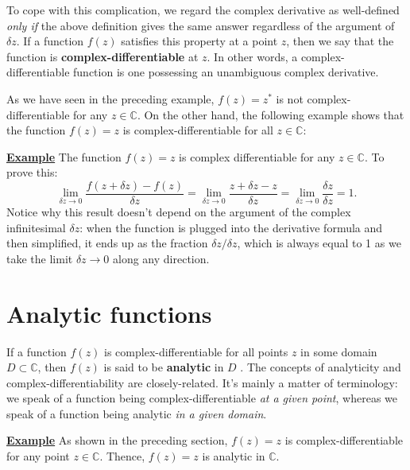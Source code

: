 \documentclass[10pt,a4paper]{article}
\begin{document}
To cope with this complication, we regard the complex derivative as
well-defined \emph{only if} the above definition gives the same answer
regardless of the argument of $\delta z$. If a function $f(z)$
satisfies this property at a point $z$, then we say that the function
is \textbf{complex-differentiable} at $z$. In other words, a
complex-differentiable function is one possessing an unambiguous
complex derivative.

As we have seen in the preceding example, $f(z) = z^*$ is not
complex-differentiable for any $z \in \mathbb{C}$. On the other hand,
the following example shows that the function $f(z) = z$ is
complex-differentiable for all $z \in \mathbb{C}$:

\begin{framed}
\noindent
\underline{\textbf{Example}}
\vskip 0.1in \noindent
The function $f(z) = z$ is complex differentiable for any
$z \in \mathbb{C}$. To prove
this:
\begin{equation}
\lim_{\delta z \rightarrow0} \frac{f(z+\delta z) - f(z)}{\delta z} = \lim_{\delta z \rightarrow0} \frac{z+\delta z - z}{\delta z} = \lim_{\delta z \rightarrow0} \frac{\delta z}{\delta z} = 1.
\end{equation}Notice
why this result doesn't depend on the argument of the complex
infinitesimal $\delta z$: when the function is plugged into the
derivative formula and then simplified, it ends up as the fraction
$\delta z / \delta z$, which is always equal to 1 as we take the limit
$\delta z \rightarrow 0$ along any direction.
\end{framed}

\section{Analytic functions}\label{analytic-functions}

If a function $f(z)$ is complex-differentiable for all points $z$ in
some domain $D\subset \mathbb{C}$, then $f(z)$ is said to be
\textbf{analytic} in $D$ . The concepts of analyticity and
complex-differentiability are closely-related. It's mainly a matter of
terminology: we speak of a function being complex-differentiable
\emph{at a given point}, whereas we speak of a function being analytic
\emph{in a given domain}.

\begin{framed}
\noindent
\underline{\textbf{Example}}
\vskip 0.1in \noindent
As shown in the preceding section, $f(z) = z$ is complex-differentiable
for any point $z \in \mathbb{C}$. Thence, $f(z) = z$ is analytic in
$\mathbb{C}$.
\end{framed}
\end{document}
